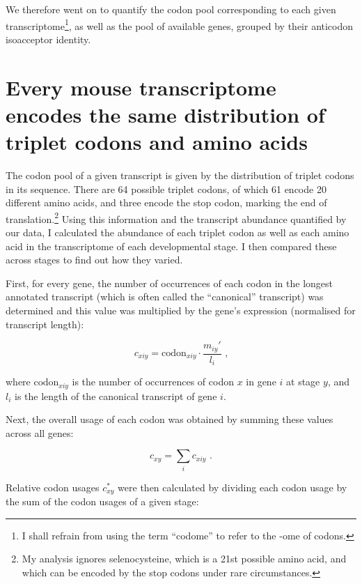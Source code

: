 We therefore went on to quantify the codon pool corresponding to each given
transcriptome\footnote{I shall refrain from using the term “codome” to refer to
the -ome of codons.}, as well as the pool of available \trna genes, grouped by
their anticodon isoacceptor identity.

\section{Every mouse  transcriptome encodes the same distribution of
triplet codons and amino acids}

The codon pool of a given \mrna transcript is given by the distribution of
triplet codons in its sequence. There are \num{64} possible triplet codons, of
which \num{61} encode \num{20} different amino acids, and three encode the stop
codon, marking the end of translation.\footnote{My analysis ignores
selenocysteine, which is a \num{21}st possible amino acid, and which can be
encoded by the stop codons  under rare circumstances.} Using this
information and the transcript abundance quantified by our \rnaseq data, I
calculated the abundance of each triplet codon as well as each amino acid in the
transcriptome of each developmental stage. I then compared these across stages
to find out how they varied.

First, for every gene, the number of occurrences of each codon in the longest
annotated transcript (which is often called the “canonical” transcript) was
determined and this value was multiplied by the gene’s expression (normalised
for transcript length):

\begin{equation}
    c_{xiy} = \text{codon}_{xiy} \cdot \frac{m_{iy}'}{l_{i}} \text{\ ,}
\end{equation}

where \(\text{codon}_{xiy}\) is the number of occurrences of codon \(x\) in gene
\(i\) at stage \(y\), and \(l_i\) is the length of the canonical transcript of
gene \(i\).

Next, the overall usage of each codon was obtained by summing these values
across all genes:

\begin{equation}
    c_{xy} = \sum_i c_{xiy} \text{\ .}
\end{equation}

Relative codon usages \(c_{xy}^*\) were then calculated by dividing each codon
usage by the sum of the codon usages of a given stage:

